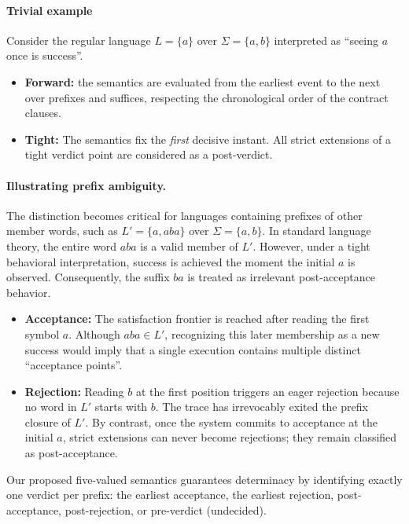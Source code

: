 \paragraph{Trivial example} Consider the regular language $L=\{a\}$ over $\Sigma=\{a,b\}$ interpreted as ``seeing $a$ once is success''.
\begin{itemize}
    \item \textbf{Forward:} the semantics are evaluated from the earliest event to the next over prefixes and suffices, respecting the chronological order of the contract clauses.
    \item \textbf{Tight:} The semantics fix the \emph{first} decisive instant. All strict extensions of a tight verdict point are considered as a post-verdict.
\end{itemize}

\paragraph{Illustrating prefix ambiguity.} The distinction becomes critical for languages containing prefixes of other member words, such as $L'=\{a, aba\}$ over $\Sigma=\{a,b\}$. In standard language theory, the entire word $aba$ is a valid member of $L'$. However, under a tight behavioral interpretation, success is achieved the moment the initial $a$ is observed. Consequently, the suffix $ba$ is treated as irrelevant post-acceptance behavior.
\begin{itemize}
\item \textbf{Acceptance:} The satisfaction frontier is reached after reading the first symbol $a$. Although $aba \in L'$, recognizing this later membership as a new success would imply that a single execution contains multiple distinct ``acceptance points''.
\item \textbf{Rejection:} Reading $b$ at the first position triggers an eager rejection because no word in $L'$ starts with $b$. The trace has irrevocably exited the prefix closure of $L'$. By contrast, once the system commits to acceptance at the initial $a$, strict extensions can never become rejections; they remain classified as post-acceptance.
\end{itemize}
Our proposed five-valued semantics guarantees determinacy by identifying exactly one verdict per prefix: the earliest acceptance, the earliest rejection, post-acceptance, post-rejection, or pre-verdict (undecided).

